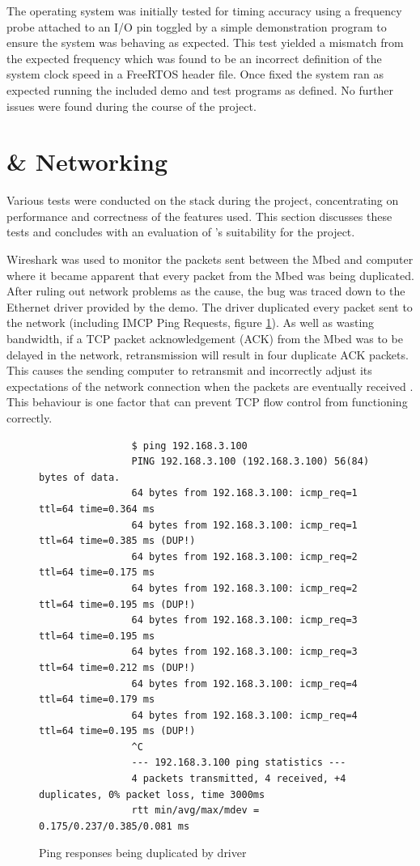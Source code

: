 		The operating system was initially tested for timing accuracy using a
		frequency probe attached to an I/O pin toggled by a simple demonstration
		program to ensure the system was behaving as expected. This test yielded a
		mismatch from the expected frequency which was found to be an incorrect
		definition of the system clock speed in a FreeRTOS header file. Once fixed
		the system ran as expected running the included demo and test programs as
		defined. No further issues were found during the course of the project.
	
	\section{\uIP{} \& Networking}
		
		Various tests were conducted on the \uIP{} stack during the project,
		concentrating on performance and correctness of the features used. This
		section discusses these tests and concludes with an evaluation of \uIP{}'s
		suitability for the project.
		
		\label{sec:udpPerformance}
		
		Wireshark was used to monitor the packets sent between the Mbed and computer
		where it became apparent that every packet from the Mbed was being
		duplicated. After ruling out network problems as the cause, the bug was
		traced down to the Ethernet driver provided by the demo. The driver
		duplicated every packet sent to the network (including IMCP Ping Requests,
		figure \ref{fig:ping}). As well as wasting bandwidth, if a TCP packet
		acknowledgement (ACK) from the Mbed was to be delayed in the network,
		retransmission will result in four duplicate ACK packets. This causes the
		sending computer to retransmit and incorrectly adjust its expectations of
		the network connection when the packets are eventually received
		\cite{duplicateack}. This behaviour is one factor that can prevent TCP flow
		control from functioning correctly.
		
		\begin{figure}
			\begin{verbatim}
				$ ping 192.168.3.100
				PING 192.168.3.100 (192.168.3.100) 56(84) bytes of data.
				64 bytes from 192.168.3.100: icmp_req=1 ttl=64 time=0.364 ms
				64 bytes from 192.168.3.100: icmp_req=1 ttl=64 time=0.385 ms (DUP!)
				64 bytes from 192.168.3.100: icmp_req=2 ttl=64 time=0.175 ms
				64 bytes from 192.168.3.100: icmp_req=2 ttl=64 time=0.195 ms (DUP!)
				64 bytes from 192.168.3.100: icmp_req=3 ttl=64 time=0.195 ms
				64 bytes from 192.168.3.100: icmp_req=3 ttl=64 time=0.212 ms (DUP!)
				64 bytes from 192.168.3.100: icmp_req=4 ttl=64 time=0.179 ms
				64 bytes from 192.168.3.100: icmp_req=4 ttl=64 time=0.195 ms (DUP!)
				^C
				--- 192.168.3.100 ping statistics ---
				4 packets transmitted, 4 received, +4 duplicates, 0% packet loss, time 3000ms
				rtt min/avg/max/mdev = 0.175/0.237/0.385/0.081 ms
			\end{verbatim}
			\caption{Ping responses being duplicated by \uIP{} driver}
			\label{fig:ping}
		\end{figure}
		
